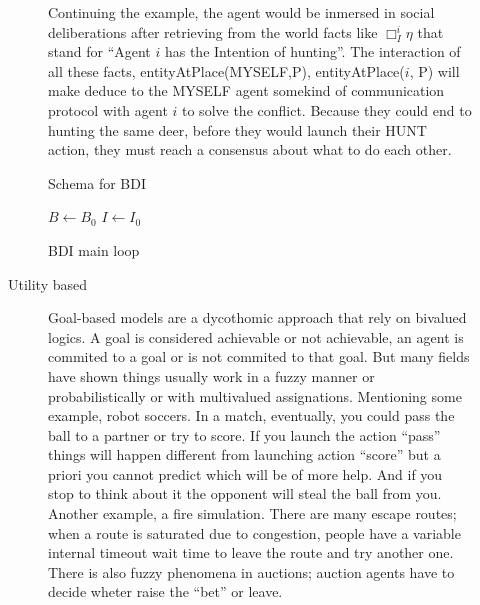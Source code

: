 \documentclass[11pt,oneside,a4paper,openright]{report}
\begin{document}
\begin{description}
\begin{description}
		Continuing the example, the agent would be inmersed in social deliberations after retrieving from the
		world facts like $\Box_{I}^i \eta$ that stand for ``Agent $i$ has the Intention of hunting''. The 
		interaction of all these facts, entityAtPlace(MYSELF,P), entityAtPlace($i$, P) will make deduce to the
		MYSELF agent somekind of communication protocol with agent $i$ to solve the conflict. Because they could 
		end to hunting the same deer, before they would launch their HUNT action, they must reach a consensus about
		what to do each other. 

		Schema for BDI	

		\begin{algorithm}[H]
		\SetAlgoLined
		\BlankLine
		$B \gets B_0$\;
		$I \gets I_0$\;
		\caption{BDI main loop}
		\end{algorithm}



		\item[Utility based]

		Goal-based models are a dycothomic approach that rely on bivalued logics. A goal is considered
		achievable or not achievable, an agent is commited to a goal or is not commited to that goal. But
		many fields have shown things usually work in a fuzzy manner or probabilistically or with multivalued
		assignations. Mentioning some example, robot soccers. In a match, eventually, you could pass the 
		ball to a partner or try to score. If you launch the action “pass” things will happen different 
		from launching action “score” but a priori you cannot predict which will be of more help. And if 
		you stop to think about it the opponent will steal the ball from you. Another example, a fire
		simulation. There are many escape routes; when a route is saturated due to congestion, people 
		have a variable internal timeout wait time to leave the route and try another one. There is also 
		fuzzy phenomena in auctions; auction agents have to decide wheter raise the ``bet'' or leave.


\end{description}
\end{description}
\end{document}

